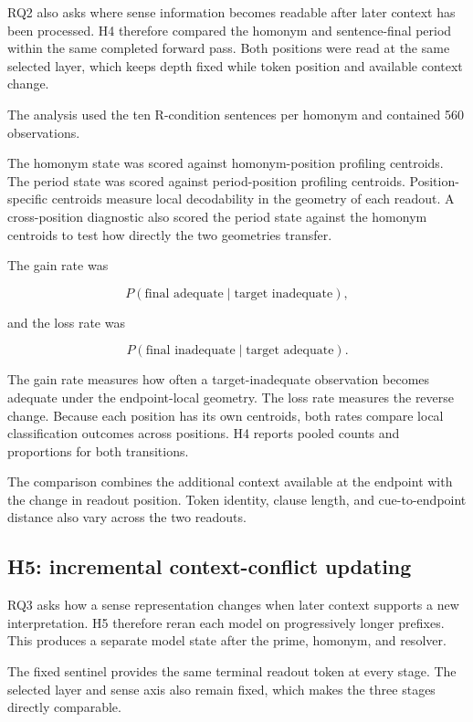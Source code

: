 \documentclass[conference]{IEEEtran}
\begin{document}
RQ2 also asks where sense information becomes readable after later context has
been processed. H4 therefore compared the homonym and sentence-final period
within the same completed forward pass. Both positions were read at the same
selected layer, which keeps depth fixed while token position and available
context change.

The analysis used the ten R-condition sentences per homonym and contained 560
observations.

The homonym state was scored against homonym-position profiling centroids. The
period state was scored against period-position profiling centroids.
Position-specific centroids measure local decodability in the geometry of each
readout. A cross-position diagnostic also scored the period state against the
homonym centroids to test how directly the two geometries transfer.

The gain rate was

\[
P(\text{final adequate}\mid\text{target inadequate}),
\]

and the loss rate was

\[
P(\text{final inadequate}\mid\text{target adequate}).
\]

The gain rate measures how often a target-inadequate observation becomes
adequate under the endpoint-local geometry. The loss rate measures the reverse
change. Because each position has its own centroids, both rates compare local
classification outcomes across positions. H4 reports pooled counts and
proportions for both transitions.

The comparison combines the additional context available at the endpoint with
the change in readout position. Token identity, clause length, and
cue-to-endpoint distance also vary across the two readouts.

\subsection{H5: incremental context-conflict updating}
\label{sec:h5}

RQ3 asks how a sense representation changes when later context supports a new
interpretation. H5 therefore reran each model on progressively longer prefixes.
This produces a separate model state after the prime, homonym, and resolver.

The fixed sentinel provides the same terminal readout token at every stage. The
selected layer and sense axis also remain fixed, which makes the three stages
directly comparable.
\end{document}

